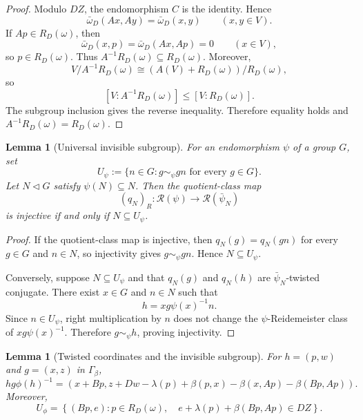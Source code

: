 \documentclass[11pt]{article}
\newtheorem{lemma}[theorem]{Lemma}
\newcommand{\RN}{\mathcal R}
\begin{document}
\begin{proof}
Modulo $DZ$, the endomorphism $C$ is the identity.  Hence
\[
  \bar\omega_D(Ax,Ay)=\bar\omega_D(x,y)
  \qquad(x,y\in V).
\]
If $Ap\in R_D(\omega)$, then
\[
  \bar\omega_D(x,p)=\bar\omega_D(Ax,Ap)=0
  \qquad(x\in V),
\]
so $p\in R_D(\omega)$.  Thus $A^{-1}R_D(\omega)\subseteq R_D(\omega)$.
Moreover,
\[
  V/A^{-1}R_D(\omega)
  \cong (A(V)+R_D(\omega))/R_D(\omega),
\]
so
\[
  [V:A^{-1}R_D(\omega)]\le [V:R_D(\omega)].
\]
The subgroup inclusion gives the reverse inequality.  Therefore equality
holds and $A^{-1}R_D(\omega)=R_D(\omega)$.
\end{proof}

\begin{lemma}[Universal invisible subgroup]
\label{lem:universalinvisible}
For an endomorphism $\psi$ of a group $G$, set
\[
  U_\psi:=\{n\in G:g\sim_\psi gn\text{ for every }g\in G\}.
\]
Let $N\triangleleft G$ satisfy $\psi(N)\subseteq N$.  Then the quotient-class
map
\[
  (q_N)_R\colon\RN(\psi)\longrightarrow\RN(\bar\psi_N)
\]
is injective if and only if $N\subseteq U_\psi$.
\end{lemma}

\begin{proof}
If the quotient-class map is injective, then $q_N(g)=q_N(gn)$ for every
$g\in G$ and $n\in N$, so injectivity gives $g\sim_\psi gn$.  Hence
$N\subseteq U_\psi$.

Conversely, suppose $N\subseteq U_\psi$ and that $q_N(g)$ and $q_N(h)$ are
$\bar\psi_N$-twisted conjugate.  There exist $x\in G$ and $n\in N$ such that
\[
  h=xg\psi(x)^{-1}n.
\]
Since $n\in U_\psi$, right multiplication by $n$ does not change the
$\psi$-Reidemeister class of $xg\psi(x)^{-1}$.  Therefore
$g\sim_\psi h$, proving injectivity.
\end{proof}

\begin{lemma}[Twisted coordinates and the invisible subgroup]
\label{lem:centralextensioncoordinates}
For $h=(p,w)$ and $g=(x,z)$ in $\Gamma_\beta$,
\begin{equation}
 h g\phi(h)^{-1}
 =\left(
 x+Bp,
 z+Dw-\lambda(p)+\beta(p,x)-\beta(x,Ap)-\beta(Bp,Ap)
 \right).
 \label{eq:generaltwistedcoordinates}
\end{equation}
Moreover,
\begin{equation}
  U_\phi
  =\left\{
  (Bp,e):
  p\in R_D(\omega),\quad
  e+\lambda(p)+\beta(Bp,Ap)\in DZ
  \right\}.
  \label{eq:invisiblesubgroupformula}
\end{equation}
\end{lemma}
\end{document}
